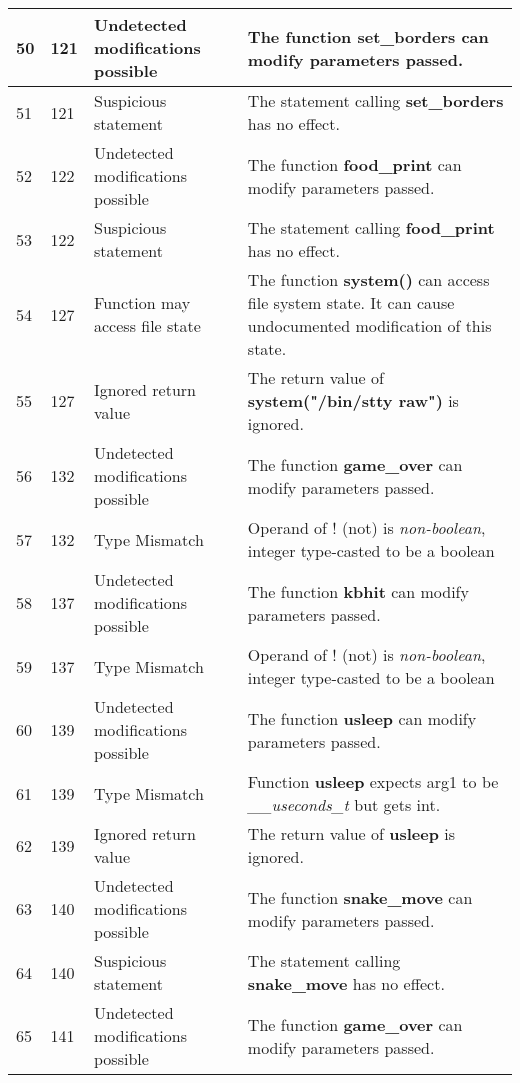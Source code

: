 \documentclass[]{article}
\begin{document}
\begin{longtable}{ |p{0.5cm}|p{0.75cm}|p{3cm}|p{9cm}|  }
		\hline 
		50 & 121 & Undetected modifications possible & The function \textbf{set\_borders} can modify parameters passed. \\
		\hline 
		51 & 121 & Suspicious statement & The statement calling \textbf{set\_borders} has no effect. \\
		\hline 
		52 & 122 & Undetected modifications possible & The function \textbf{food\_print} can modify parameters passed. \\
		\hline 
		53 & 122 & Suspicious statement & The statement calling \textbf{food\_print} has no effect. \\
		\hline 
		54 & 127 & Function may access file state & The function \textbf{system()} can access file system state. It can cause undocumented modification of this state. \\
		\hline 
		55 & 127 & Ignored return value & The return value of \textbf{system("/bin/stty raw")} is ignored. \\
		\hline 
		56 & 132 & Undetected modifications possible & The function \textbf{game\_over} can modify parameters passed. \\
		\hline 
		57 & 132 & Type Mismatch & Operand of ! (not) is \textit{non-boolean}, integer type-casted to be a boolean \\
		\hline 
		58 & 137 & Undetected modifications possible & The function \textbf{kbhit} can modify parameters passed. \\
		\hline 
		59 & 137 & Type Mismatch & Operand of ! (not) is \textit{non-boolean}, integer type-casted to be a boolean \\
		\hline 
		60 & 139 & Undetected modifications possible & The function \textbf{usleep} can modify parameters passed. \\
		\hline 
		61 & 139 & Type Mismatch & Function \textbf{usleep} expects arg1 to be \textit{\_\_useconds\_t} but gets int. \\
		\hline
		62 & 139 & Ignored return value & The return value of \textbf{usleep} is ignored. \\
		\hline
		63 & 140 & Undetected modifications possible & The function \textbf{snake\_move} can modify parameters passed. \\
		\hline    
		64 & 140 & Suspicious statement & The statement calling \textbf{snake\_move} has no effect. \\
		\hline    
		65 & 141 & Undetected modifications possible & The function \textbf{game\_over} can modify parameters passed. \\
		\hline    

\end{longtable}
\end{document}
